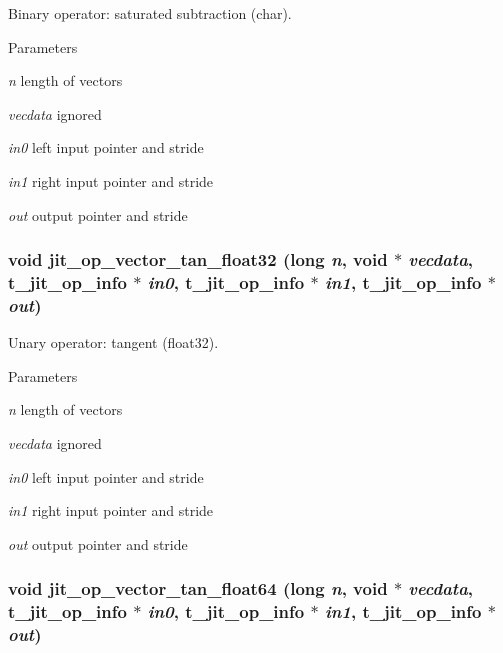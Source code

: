 Binary operator: saturated subtraction (char). 
\begin{DoxyParams}{Parameters}
\item[{\em n}]length of vectors \item[{\em vecdata}]ignored \item[{\em in0}]left input pointer and stride \item[{\em in1}]right input pointer and stride \item[{\em out}]output pointer and stride \end{DoxyParams}
\hypertarget{group__opvecmod_ga57204f20348af7decab1537293a7d55d}{
\subsubsection[{jit\_\-op\_\-vector\_\-tan\_\-float32}]{\setlength{\rightskip}{0pt plus 5cm}void jit\_\-op\_\-vector\_\-tan\_\-float32 (long {\em n}, \/  void $\ast$ {\em vecdata}, \/  {\bf t\_\-jit\_\-op\_\-info} $\ast$ {\em in0}, \/  {\bf t\_\-jit\_\-op\_\-info} $\ast$ {\em in1}, \/  {\bf t\_\-jit\_\-op\_\-info} $\ast$ {\em out})}}
\label{group__opvecmod_ga57204f20348af7decab1537293a7d55d}


Unary operator: tangent (float32). 
\begin{DoxyParams}{Parameters}
\item[{\em n}]length of vectors \item[{\em vecdata}]ignored \item[{\em in0}]left input pointer and stride \item[{\em in1}]right input pointer and stride \item[{\em out}]output pointer and stride \end{DoxyParams}
\hypertarget{group__opvecmod_gac14fe8ff474f94a361a659cf9b6dca15}{
\subsubsection[{jit\_\-op\_\-vector\_\-tan\_\-float64}]{\setlength{\rightskip}{0pt plus 5cm}void jit\_\-op\_\-vector\_\-tan\_\-float64 (long {\em n}, \/  void $\ast$ {\em vecdata}, \/  {\bf t\_\-jit\_\-op\_\-info} $\ast$ {\em in0}, \/  {\bf t\_\-jit\_\-op\_\-info} $\ast$ {\em in1}, \/  {\bf t\_\-jit\_\-op\_\-info} $\ast$ {\em out})}}
\label{group__opvecmod_gac14fe8ff474f94a361a659cf9b6dca15}


